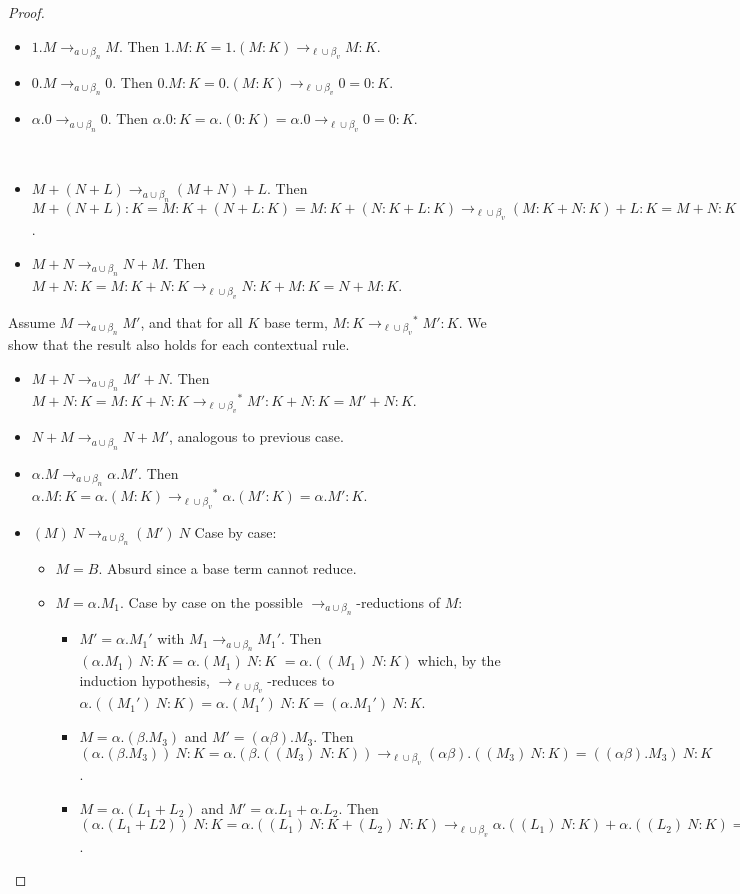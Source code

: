 \documentclass{LMCS}
\newcommand{\xto}[1]{\ensuremath{\rightarrow_{#1}}}
\newcommand{\toblinred}{\xto{\ell\cup\beta_v}}
\newcommand{\tobalgred}{\xto{a\cup\beta_n}}
\newcommand{\stoblinred}{\ensuremath{\xto{\ell\cup\beta_v}^{\ast}}}
\begin{document}
\begin{proof}
\begin{description}
\begin{itemize}
	\item $1.M\tobalgred M$. Then $1.M:K=1.(M:K)\toblinred M:K$.
	\item $0.M\tobalgred 0$. Then  $0.M:K=0.(M:K)\toblinred 0=0:K$.
	\item $\alpha.0\tobalgred 0$. Then  $\alpha.0:K=\alpha.(0:K)=\alpha.0\toblinred 0=0:K$.
      \end{itemize}
    \item[Rules $Asso$ and $Com$]~
      \begin{itemize}
	\item $M+(N+L)\tobalgred (M+N)+L$. Then $M+(N+L):K=M:K+(N+L:K)=M:K+(N:K+L:K)\toblinred (M:K+N:K)+L:K=M+N:K+L:K=(M+N)+L:K$.
	\item $M+N\tobalgred N+M$. Then $M+N:K=M:K+N:K\toblinred N:K+M:K=N+M:K$.
      \end{itemize}
    \item[Rules $\xi$] Assume $M\tobalgred M'$, and that for all $K$ base term, $M:K\stoblinred M':K$. We show that the result also holds for each contextual rule.
      \begin{itemize}
	\item $M+N\tobalgred M'+N$. Then $M+N:K=M:K+N:K\stoblinred M':K+N:K=M'+N:K$.
	\item $N+M\tobalgred N+M'$, analogous to previous case.
	\item $\alpha.M\tobalgred\alpha.M'$. Then $\alpha.M:K=\alpha.(M:K)\stoblinred \alpha.(M':K)=\alpha.M':K$.
	\item $(M)~N\tobalgred (M')~N$ Case by case:
	  \begin{itemize}
	    \item $M=B$. Absurd since a base term cannot reduce.
	    \item $M=\alpha.M_1$. Case by case on the possible $\tobalgred$-reductions of $M$:
	      \begin{itemize}
		\item $M'=\alpha.M_1'$ with $M_1\tobalgred M_1'$. Then $(\alpha.M_1)~N:K=\alpha.(M_1)~N:K$ $=\alpha.((M_1)~N:K)$ which, by the induction hypothesis, $\toblinred$-reduces to $\alpha.((M_1')~N:K)=\alpha.(M_1')~N:K=(\alpha.M_1')~N:K$.
		\item $M=\alpha.(\beta.M_3)$ and $M'=(\alpha\beta).M_3$. Then $(\alpha.(\beta.M_3))~N:K=\alpha.(\beta.((M_3)~N:K))\toblinred(\alpha\beta).((M_3)~N:K)=((\alpha\beta).M_3)~N:K$.
		\item $M=\alpha.(L_1+L_2)$ and $M'=\alpha.L_1+\alpha.L_2$. Then $(\alpha.(L_1+L2))~N:K=\alpha.((L_1)~N:K+(L_2)~N:K)\toblinred\alpha.((L_1)~N:K)+\alpha.((L_2)~N:K)=(\alpha.L_1+\alpha.L2)~N:K$.

\end{itemize}
\end{itemize}
\end{itemize}
\end{description}
\end{proof}
\end{document}
